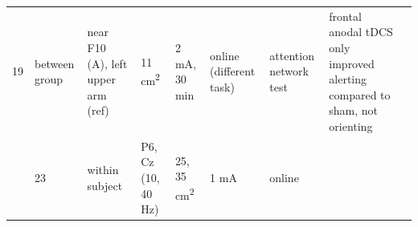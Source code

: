 \documentclass[11pt,english,]{memoir}
\begin{document}
\begin{longtable}[]{@{}lllllllll@{}}
\begin{minipage}[t]{0.02\columnwidth}
19\strut
\end{minipage} & \begin{minipage}[t]{0.04\columnwidth}\raggedright
between
group\strut
\end{minipage} & \begin{minipage}[t]{0.11\columnwidth}\raggedright
near F10 (A), left upper
arm (ref)\strut
\end{minipage} & \begin{minipage}[t]{0.03\columnwidth}\raggedright
11
cm\textsuperscript{2}\strut
\end{minipage} & \begin{minipage}[t]{0.05\columnwidth}\raggedright
2 mA, 30
min\strut
\end{minipage} & \begin{minipage}[t]{0.05\columnwidth}\raggedright
online
(different
task)\strut
\end{minipage} & \begin{minipage}[t]{0.11\columnwidth}\raggedright
attention network test\strut
\end{minipage} & \begin{minipage}[t]{0.24\columnwidth}\raggedright
frontal anodal tDCS only improved alerting compared to sham,
not orienting\strut
\end{minipage}\tabularnewline
\begin{minipage}[t]{0.12\columnwidth}\raggedright
\textcite{Hopfinger2016}\strut
\end{minipage} & \begin{minipage}[t]{0.02\columnwidth}\raggedright
23\strut
\end{minipage} & \begin{minipage}[t]{0.04\columnwidth}\raggedright
within
subject\strut
\end{minipage} & \begin{minipage}[t]{0.11\columnwidth}\raggedright
P6, Cz (10, 40 Hz)\strut
\end{minipage} & \begin{minipage}[t]{0.03\columnwidth}\raggedright
25,
35
cm\textsuperscript{2}\strut
\end{minipage} & \begin{minipage}[t]{0.05\columnwidth}\raggedright
1 mA\strut
\end{minipage} & \begin{minipage}[t]{0.05\columnwidth}\raggedright
online\strut
\end{minipage} & \begin{minipage}[t]{0.11\columnwidth}\raggedright

\end{minipage}
\end{longtable}
\end{document}
